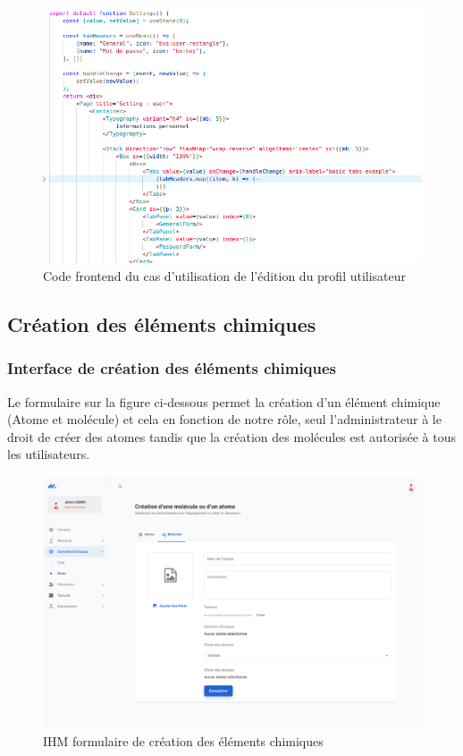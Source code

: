 \begin{figure}[H]
	\centering
	\includegraphics[width=1\textwidth]{img/fuu}
	\caption{Code frontend du cas d'utilisation de l'édition du profil utilisateur}
	\label{fig:mesh1}
\end{figure}

\subsection{Création des éléments chimiques}

\subsubsection{Interface de création des éléments chimiques}

Le formulaire sur la figure ci-dessous permet la création d'un élément chimique (Atome et molécule) et cela en fonction de notre rôle, seul l'administrateur à le droit de créer des atomes tandis que la création des molécules est autorisée à tous les utilisateurs.

\begin{figure}[H]
	\centering
	\includegraphics[width=1\textwidth]{img/iec}
	\caption{IHM formulaire de création des éléments chimiques}
	\label{fig:mesh1}
\end{figure}


